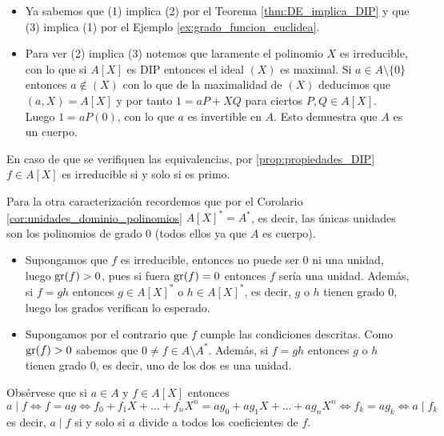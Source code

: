 \begin{proofbox}

\begin{itemize}
\item Ya sabemos que (1) implica (2) por el Teorema \ref{thm:DE_implica_DIP} y que (3) implica (1) por el Ejemplo \ref{ex:grado_funcion_euclidea}.

\item Para ver (2) implica (3) notemos que laramente el polinomio $X$ es irreducible, con lo que si $A[X]$ es DIP entonces el ideal $(X)$ es maximal. Si $a \in A \setminus \{0\}$ entonces $a \notin (X)$ con lo que de la maximalidad de $(X)$ deducimos que $(a, X) = A[X]$ y por tanto $1 = aP + XQ$ para ciertos $P, Q \in A[X]$. Luego $1 = aP(0)$, con lo que $a$ es invertible en $A$. Esto demuestra que $A$ es un cuerpo.
\end{itemize}

En caso de que se verifiquen las equivalencias, por \ref{prop:propiedades_DIP} $f \in A[X]$ es irreducible si y solo si es primo.

Para la otra caracterización recordemos que por el Corolario \ref{cor:unidades_dominio_polinomios} $A[X]^* = A^*$, es decir, las únicas unidades son los polinomios de grado $0$ (todos ellos ya que $A$ es cuerpo).

\begin{itemize}
\item Supongamos que $f$ es irreducible, entonces no puede ser 0 ni una unidad, luego $\operatorname{gr}(f) > 0$, pues si fuera $\operatorname{gr}(f) = 0$ entonces $f$ sería una unidad. Además, si $f = gh$ entonces $g \in A[X]^*$ o $h \in A[X]^*$, es decir, $g$ o $h$ tienen grado 0, luego los grados verifican lo esperado.

\item Supongamos por el contrario que $f$ cumple las condiciones descritas. Como $\operatorname{gr}(f) > 0$ sabemos que $0 \neq f \in A \setminus A^*$. Además, si $f = gh$ entonces $g$ o $h$ tienen grado 0, es decir, uno de los dos es una unidad.
\end{itemize}

\end{proofbox}

Obsérvese que si $a \in A$ y $f \in A[X]$ entonces
\[
a \mid f \iff f = ag \iff f_0 + f_1X + \dots + f_nX^n = ag_0 + ag_1X + \dots + ag_nX^n \iff f_k = a g_k \iff a \mid f_k
\]
es decir, $a \mid f$ si y solo si $a$ divide a todos los coeficientes de $f$.

